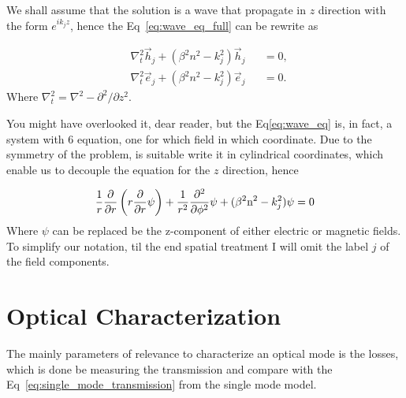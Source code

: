 We shall assume that the solution is a wave that propagate in $z$ direction with the form $e^{ik_jz}$, hence the Eq~\ref{eq:wave_eq_full} can be rewrite as 

\begin{subequations}
    \begin{alignat}{2}
    &\nabla_t^2\vec{h}_j+(\beta^2n^2-k_j^2)\vec{h}_j &&=0,\\
    &\nabla_t^2\vec{e}_j+(\beta^2n^2-k_j^2)\vec{e}_j &&=0.
    \end{alignat}
    \label{eq:wave_eq}
\end{subequations}
Where $\nabla_t^2 = \nabla^2 - \partial^2/\partial z^2$.

You might have overlooked it, dear reader, but the Eq\ref{eq:wave_eq} is, in fact, a system with 6 equation, one for which field in which coordinate. Due to the symmetry of the problem, is suitable write it in cylindrical coordinates, which enable us to decouple the equation for the $z$ direction, hence

\begin{equation}
    \frac{1}{r}\dfrac{\partial }{\partial r}\left(r \dfrac{\partial  }{\partial r}\psi\right)+\frac{1}{r^2} \dfrac{\partial ^2}{\partial \phi^2}\psi + (\beta^2\text{n}^2-k_j^2)\psi = 0 
\end{equation}
Where $\psi$ can be replaced be the z-component of either electric or magnetic fields. To simplify our notation, til the end spatial treatment I will omit the label $j$ of the field components. 







\section{Optical Characterization}

The mainly parameters of relevance to characterize an optical mode is the losses, which is done be measuring the transmission and compare with the Eq~\ref{eq:single_mode_transmission} from the single mode model. 


